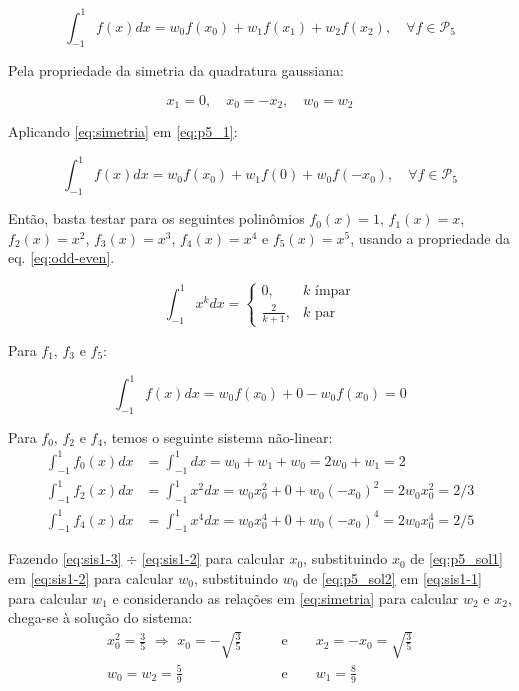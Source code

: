 \documentclass[a4,12pt]{horizon-theme}
\begin{document}
\begin{equation}\label{eq:p5_1}
  \int_{-1}^{1} f(x)dx = w_0f(x_0) + w_1f(x_1) + w_2f(x_2),\quad \forall f \in \mathcal{P}_5
\end{equation}

Pela propriedade da simetria da quadratura gaussiana:

\begin{equation}\label{eq:simetria}
  x_1 = 0,\quad x_0 = -x_2,\quad w_0 = w_2
\end{equation}

Aplicando \eqref{eq:simetria} em \eqref{eq:p5_1}:

\begin{equation}
  \int_{-1}^{1} f(x)dx = w_0f(x_0) + w_1f(0) + w_0f(-x_0),\quad \forall f \in \mathcal{P}_5
\end{equation}



Então, basta testar para os seguintes polinômios $f_0(x) = 1$, $f_1(x) = x$, $f_2(x) = x^2$, $f_3(x) = x^3$, $f_4(x) = x^4$ e $f_5(x) = x^5$, usando a propriedade da eq. \eqref{eq:odd-even}.

\begin{equation}\label{eq:odd-even}
  \int_{-1}^1 x^kdx =
  \begin{cases}
    0,                          & k \textrm{ ímpar} \\
    \displaystyle\frac{2}{k+1}, & k \textrm{ par}
  \end{cases}
\end{equation}

Para $f_1$, $f_3$ e $f_5$:

\begin{equation}
  \int_{-1}^{1} f(x)dx = w_0f(x_0) + 0 - w_0f(x_0) = 0
\end{equation}

Para $f_0$, $f_2$ e $f_4$, temos o seguinte sistema não-linear:
\begin{align}
  \label{eq:sis1-1}\displaystyle\int_{-1}^{1} f_0(x)dx & = \int_{-1}^{1} dx = w_0 + w_1 + w_0 = 2w_0 + w_1 = 2                \\
  \label{eq:sis1-2}\displaystyle\int_{-1}^{1} f_2(x)dx & = \int_{-1}^{1} x^2dx = w_0x_0^2 + 0 + w_0(-x_0)^2 = 2w_0x_0^2 = 2/3 \\
  \label{eq:sis1-3}\displaystyle\int_{-1}^{1} f_4(x)dx & = \int_{-1}^{1} x^4dx = w_0x_0^4 + 0 + w_0(-x_0)^4 = 2w_0x_0^4 = 2/5
\end{align}

Fazendo \eqref{eq:sis1-3} $\div$ \eqref{eq:sis1-2} para calcular $x_0$, substituindo $x_0$ de \eqref{eq:p5_sol1} em \eqref{eq:sis1-2} para calcular $w_0$, substituindo $w_0$ de \eqref{eq:p5_sol2} em \eqref{eq:sis1-1} para calcular $w_1$ e considerando as relações em \eqref{eq:simetria} para calcular $w_2$ e $x_2$, chega-se à solução do sistema:
\begin{align}
  \label{eq:p5_sol1}x_0^2 = \frac{3}{5}\,\,\Rightarrow\,\,x_0 = -\sqrt{\frac{3}{5}} \qquad & \textrm{e} \qquad x_2 = -x_0 = \sqrt{\frac{3}{5}} \\
  \label{eq:p5_sol2}w_0 = w_2 = \frac{5}{9} \qquad                                         & \textrm{e} \qquad w_1 = \frac{8}{9}
\end{align}
\end{document}
